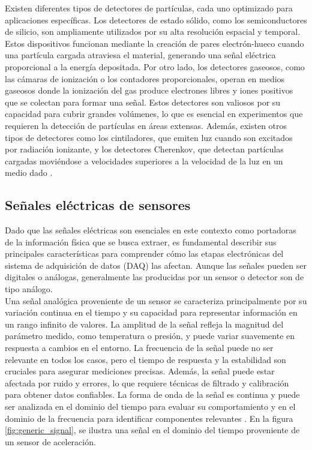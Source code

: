 \documentclass{report}
\begin{document}
\noindent Existen diferentes tipos de detectores de partículas, cada uno optimizado para aplicaciones específicas. Los detectores de estado sólido, como los semiconductores de silicio, son ampliamente utilizados por su alta resolución espacial y temporal. Estos dispositivos funcionan mediante la creación de pares electrón-hueco cuando una partícula cargada atraviesa el material, generando una señal eléctrica proporcional a la energía depositada. Por otro lado, los detectores gaseosos, como las cámaras de ionización o los contadores proporcionales, operan en medios gaseosos donde la ionización del gas produce electrones libres y iones positivos que se colectan para formar una señal. Estos detectores son valiosos por su capacidad para cubrir grandes volúmenes, lo que es esencial en experimentos que requieren la detección de partículas en áreas extensas. Además, existen otros tipos de detectores como los cintiladores, que emiten luz cuando son excitados por radiación ionizante, y los detectores Cherenkov, que detectan partículas cargadas moviéndose a velocidades superiores a la velocidad de la luz en un medio dado \cite{kolanoski1}.

\subsection{Señales eléctricas de sensores}

\noindent Dado que las señales eléctricas son esenciales en este contexto como portadoras de la información física que se busca extraer, es fundamental describir sus principales características para comprender cómo las etapas electrónicas del sistema de adquisición de datos (DAQ) las afectan. Aunque las señales pueden ser digitales o análogas, generalmente las producidas por un sensor o detector son de tipo análogo. \\

\noindent Una señal analógica proveniente de un sensor se caracteriza principalmente por su variación continua en el tiempo y su capacidad para representar información en un rango infinito de valores. La amplitud de la señal refleja la magnitud del parámetro medido, como temperatura o presión, y puede variar suavemente en respuesta a cambios en el entorno. La frecuencia de la señal puede no ser relevante en todos los casos, pero el tiempo de respuesta y la estabilidad son cruciales para asegurar mediciones precisas. Además, la señal puede estar afectada por ruido y errores, lo que requiere técnicas de filtrado y calibración para obtener datos confiables. La forma de onda de la señal es continua y puede ser analizada en el dominio del tiempo para evaluar su comportamiento y en el dominio de la frecuencia para identificar componentes relevantes \cite{sinclair2}. En la figura \ref{fig:generic_signal}, se ilustra una señal en el dominio del tiempo proveniente de un sensor de aceleración.\\
\end{document}
